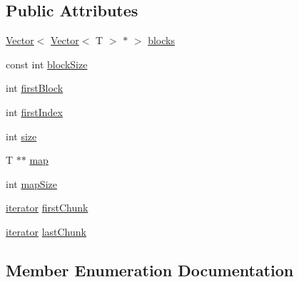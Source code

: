 \subsection*{Public Attributes}
\begin{DoxyCompactItemize}
\item 
\hyperlink{classprism_1_1containers_1_1_vector}{Vector}$<$ \hyperlink{classprism_1_1containers_1_1_vector}{Vector}$<$ T $>$ $\ast$ $>$ \hyperlink{structprism_1_1containers_1_1_deque_data_aa84964f19132377a1b0e279cee39444a}{blocks}
\item 
const int \hyperlink{structprism_1_1containers_1_1_deque_data_aa2a0df06a41e01942111238c8565e4df}{block\+Size}
\item 
int \hyperlink{structprism_1_1containers_1_1_deque_data_aa4a6f7338647fcb521e03cec6ac3d49f}{first\+Block}
\item 
int \hyperlink{structprism_1_1containers_1_1_deque_data_abcaa9b410d36d9d02685d94b694637c2}{first\+Index}
\item 
int \hyperlink{structprism_1_1containers_1_1_deque_data_a1c56f1c017d760cadb912ae82fc5722a}{size}
\item 
T $\ast$$\ast$ \hyperlink{structprism_1_1containers_1_1_deque_data_a1760fab65f72a59bf121f84042409462}{map}
\item 
int \hyperlink{structprism_1_1containers_1_1_deque_data_a0fff90781042b14137e69017dc0d6479}{map\+Size}
\item 
\hyperlink{classprism_1_1containers_1_1_deque_iterator}{iterator} \hyperlink{structprism_1_1containers_1_1_deque_data_a20b372c923c7c2597f4a497435d34b42}{first\+Chunk}
\item 
\hyperlink{classprism_1_1containers_1_1_deque_iterator}{iterator} \hyperlink{structprism_1_1containers_1_1_deque_data_a8f635e8ceaa6bca00bec0f54079abea4}{last\+Chunk}
\end{DoxyCompactItemize}


\subsection{Member Enumeration Documentation}
